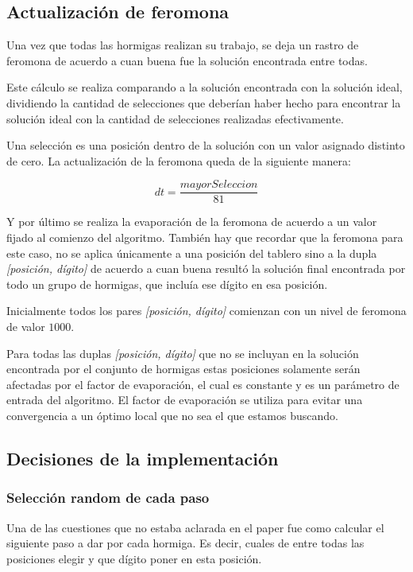 \documentclass[a4paper,spanish]{article}
\begin{document}
\subsection{Actualización de feromona}

Una vez que todas las hormigas realizan su trabajo, se deja un rastro de feromona de acuerdo a cuan
buena fue la solución encontrada entre todas.

Este cálculo se realiza comparando a la solución encontrada con la solución ideal, dividiendo la
cantidad de selecciones que deberían haber hecho para encontrar la solución ideal con la cantidad
de selecciones realizadas efectivamente.

Una selección es una posición dentro de la solución con un valor asignado distinto de cero. La
actualización de la feromona queda de la siguiente manera:

\begin{equation}
	dt = \dfrac{mayorSeleccion}{81}
\end{equation}


Y por último se realiza la evaporación de la feromona de acuerdo a un valor fijado al comienzo del
algoritmo. También hay que recordar que la feromona para este caso, no se aplica únicamente a una
posición del tablero sino a la dupla \emph{[posición, dígito]} de acuerdo a cuan buena resultó la solución
final encontrada por todo un grupo de hormigas, que incluía ese dígito en esa posición.

Inicialmente todos los pares \emph{[posición, dígito]} comienzan con un nivel de feromona de valor $1000$.

Para todas las duplas \emph{[posición, dígito]} que no se incluyan en la solución encontrada por el conjunto
de hormigas estas posiciones solamente serán afectadas por el factor de evaporación, el cual es
constante y es un parámetro de entrada del algoritmo. El factor de evaporación se utiliza para evitar
una convergencia a un óptimo local que no sea el que estamos buscando.

\subsection{Decisiones de la implementación}

\subsubsection{Selección random de cada paso}

Una de las cuestiones que no estaba aclarada en el paper fue como calcular el siguiente paso a dar
por cada hormiga. Es decir, cuales de entre todas las posiciones elegir y que dígito poner en esta posición.
\end{document}
